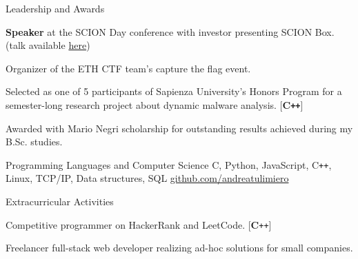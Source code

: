 \documentclass{resume}
\begin{document}
\begin{rSection}{Leadership and Awards}

\begin{rSubsection}{}{}{}{}
\item \textbf{Speaker} at the SCION Day conference with investor presenting SCION Box. (talk available \href{https://video.ethz.ch/events/2019/scion/61dd8a87-3894-489d-99d3-77ca66c5ad38.html}{here})
\item Organizer of the ETH CTF team's capture the flag event.
\item Selected as one of 5 participants of Sapienza University's Honors Program for a semester-long research project about dynamic malware analysis. [\textbf{C\texttt{++}}]
\item Awarded with Mario Negri scholarship for outstanding results achieved during my B.Sc. studies.
\end{rSubsection}

\end{rSection}


\begin{rSection}{Programming Languages and Computer Science}
C, Python, JavaScript, C\texttt{++}, Linux, TCP/IP, Data structures, SQL \hfill \href{https://github.com/andreatulimiero}{github.com/andreatulimiero}
\end{rSection}


\begin{rSection}{Extracurricular Activities}

\begin{rSubsection}{}{}{}{}
\item Competitive programmer on HackerRank and LeetCode. [\textbf{C}\texttt{++}]
\item Freelancer full-stack web developer realizing ad-hoc solutions for small companies.
\end{rSubsection}
\end{rSection}
\end{document}
